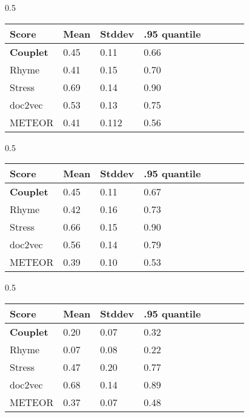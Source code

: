 \documentclass[11pt,a4paper]{article}
\begin{document}
\begin{table*}[ht]
\begin{subtable}{0.5\textwidth}
\begin{tabular}{llll c c c c}
	\hline\hline
	Score & Mean & Stddev & .95 quantile \\ [0.5ex]
	\hline
	\textbf{Couplet} & 0.45 & 0.11 & 0.66 \\ [0.5ex]
	\hline
	Rhyme & 0.41 & 0.15 & 0.70 \\ [0.5ex]
	\hline
	Stress & 0.69 & 0.14 & 0.90 \\ [0.5ex]
	\hline
	doc2vec & 0.53 & 0.13 & 0.75 \\ [0.5ex]
	\hline
	METEOR & 0.41 & 0.112 & 0.56 \\ [0.5ex]
	\hline
\end{tabular}
\caption{Gold standard baseline, Gutenberg}\label{tab:results_a}
\end{subtable}
\begin{subtable}{0.5\textwidth}
\begin{tabular}{llll c c c c}
	\hline\hline
	Score & Mean & Stddev & .95 quantile \\ [0.5ex]
	\hline
	\textbf{Couplet} & 0.45 & 0.11 & 0.67 \\ [0.5ex]
	\hline
	Rhyme & 0.42 & 0.16 & 0.73 \\ [0.5ex]
	\hline
	Stress & 0.66 & 0.15 & 0.90 \\ [0.5ex]
	\hline
	doc2vec & 0.56 & 0.14 & 0.79 \\ [0.5ex]
	\hline
	METEOR & 0.39 & 0.10 & 0.53 \\ [0.5ex]
	\hline
\end{tabular}
\caption{Silver standard baseline, PoetryFoundation}\label{tab:results_a}
\end{subtable}
\begin{subtable}{0.5\textwidth}
\begin{tabular}{llll c c c c}
	\hline\hline
	Score & Mean & Stddev & .95 quantile \\ [0.5ex]
	\hline
	\textbf{Couplet} & 0.20 & 0.07 & 0.32 \\ [0.5ex]
	\hline
	Rhyme & 0.07 & 0.08 & 0.22 \\ [0.5ex]
	\hline
	Stress & 0.47 & 0.20 & 0.77 \\ [0.5ex]
	\hline
	doc2vec & 0.68 & 0.14 & 0.89 \\ [0.5ex]
	\hline
	METEOR & 0.37 & 0.07 & 0.48 \\ [0.5ex]
	\hline
\end{tabular}
\caption{Prose baseline}\label{tab:results_a}

\end{subtable}
\end{table*}
\end{document}
